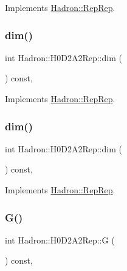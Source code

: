 Implements \mbox{\hyperlink{structHadron_1_1RepRep_a92c8802e5ed7afd7da43ccfd5b7cd92b}{Hadron\+::\+Rep\+Rep}}.

\mbox{\label{structHadron_1_1H0D2A2Rep_adb95283717eaea61e9e0681f2b9dda63}} 
\subsubsection{\texorpdfstring{dim()}{dim()}\hspace{0.1cm}{\footnotesize\ttfamily [2/3]}}
{\footnotesize\ttfamily int Hadron\+::\+H0\+D2\+A2\+Rep\+::dim (\begin{DoxyParamCaption}{ }\end{DoxyParamCaption}) const\hspace{0.3cm}{\ttfamily [inline]}, {\ttfamily [virtual]}}



Implements \mbox{\hyperlink{structHadron_1_1RepRep_a92c8802e5ed7afd7da43ccfd5b7cd92b}{Hadron\+::\+Rep\+Rep}}.

\mbox{\label{structHadron_1_1H0D2A2Rep_adb95283717eaea61e9e0681f2b9dda63}} 
\subsubsection{\texorpdfstring{dim()}{dim()}\hspace{0.1cm}{\footnotesize\ttfamily [3/3]}}
{\footnotesize\ttfamily int Hadron\+::\+H0\+D2\+A2\+Rep\+::dim (\begin{DoxyParamCaption}{ }\end{DoxyParamCaption}) const\hspace{0.3cm}{\ttfamily [inline]}, {\ttfamily [virtual]}}



Implements \mbox{\hyperlink{structHadron_1_1RepRep_a92c8802e5ed7afd7da43ccfd5b7cd92b}{Hadron\+::\+Rep\+Rep}}.

\mbox{\label{structHadron_1_1H0D2A2Rep_acee9edaa8107329ea6d26aa6384ca83f}} 
\subsubsection{\texorpdfstring{G()}{G()}\hspace{0.1cm}{\footnotesize\ttfamily [1/2]}}
{\footnotesize\ttfamily int Hadron\+::\+H0\+D2\+A2\+Rep\+::G (\begin{DoxyParamCaption}{ }\end{DoxyParamCaption}) const\hspace{0.3cm}{\ttfamily [inline]}, {\ttfamily [virtual]}}

